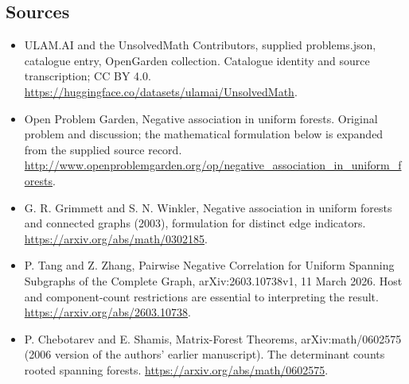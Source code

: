 \documentclass[11pt,a4paper]{article}
\begin{document}
\subsection{Sources}
\begin{itemize}
\item[S1] ULAM.AI and the UnsolvedMath Contributors, supplied problems.json, catalogue entry, OpenGarden collection. Catalogue identity and source transcription; CC BY 4.0.
\url{https://huggingface.co/datasets/ulamai/UnsolvedMath}.
\item[S2] Open Problem Garden, Negative association in uniform forests. Original problem and discussion; the mathematical formulation below is expanded from the supplied source record.
\url{http://www.openproblemgarden.org/op/negative_association_in_uniform_forests}.
\item[S3] G. R. Grimmett and S. N. Winkler, Negative association in uniform forests and connected graphs (2003), formulation for distinct edge indicators.
\url{https://arxiv.org/abs/math/0302185}.
\item[S4] P. Tang and Z. Zhang, Pairwise Negative Correlation for Uniform Spanning Subgraphs of the Complete Graph, arXiv:2603.10738v1, 11 March 2026. Host and component-count restrictions are essential to interpreting the result.
\url{https://arxiv.org/abs/2603.10738}.
\item[S5] P. Chebotarev and E. Shamis, Matrix-Forest Theorems, arXiv:math/0602575 (2006 version of the authors' earlier manuscript). The determinant counts rooted spanning forests.
\url{https://arxiv.org/abs/math/0602575}.
\end{itemize}
\end{document}
